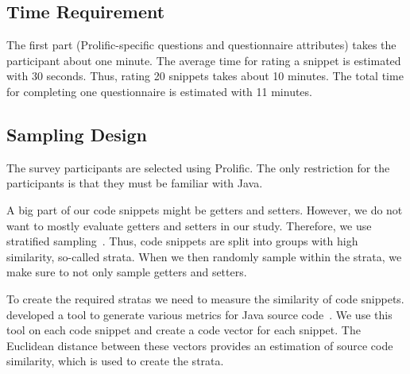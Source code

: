 \documentclass[%
class=scrreprt,
chapterprefix=false,%
open=right,%
twoside=false,%
paper=a4,%
logofile={Logo\_zentral\_farbig\_EN.png},%
thesistype=masterproposal,%
UKenglish,%
]{se2thesis}
\begin{document}

\subsection{Time Requirement}
The first part (Prolific-specific questions and questionnaire attributes) takes the participant about one minute. The average time for rating a snippet is estimated with 30 seconds. Thus, rating 20 snippets takes about 10 minutes. The total time for completing one questionnaire is estimated with 11 minutes.

\subsection{Sampling Design}
The survey participants are selected using Prolific. The only restriction for the participants is that they must be familiar with Java.

A big part of our code snippets might be getters and setters. However, we do not want to mostly evaluate getters and setters in our study. Therefore, we use stratified sampling~\cite{thompson2012sampling}. Thus, code snippets are split into groups with high similarity, so-called strata. When we then randomly sample within the strata, we make sure to not only sample getters and setters.

To create the required stratas we need to measure the similarity of code snippets. \citeauthor{scalabrino2018comprehensive} developed a tool to generate various metrics for Java source code~\cite{scalabrino2018comprehensive}. We use this tool on each code snippet and create a code vector for each snippet. The Euclidean distance between these vectors provides an estimation of source code similarity, which is used to create the strata.
\end{document}
